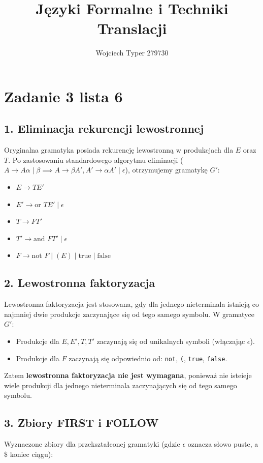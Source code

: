 \documentclass{article}
\title{Języki Formalne i Techniki Translacji}
\author{Wojciech Typer 279730}
\date{}
\begin{document}
\maketitle

\section*{Zadanie 3 lista 6}

\subsection*{1. Eliminacja rekurencji lewostronnej}
Oryginalna gramatyka posiada rekurencję lewostronną w produkcjach dla $E$ oraz $T$. Po zastosowaniu standardowego algorytmu eliminacji ($A \to A\alpha \mid \beta \implies A \to \beta A', A' \to \alpha A' \mid \epsilon$), otrzymujemy gramatykę $G'$:

\begin{itemize}
    \item $E \to T E'$
    \item $E' \to \text{or } T E' \mid \epsilon$
    \item $T \to F T'$
    \item $T' \to \text{and } F T' \mid \epsilon$
    \item $F \to \text{not } F \mid ( E ) \mid \text{true} \mid \text{false}$
\end{itemize}

\subsection*{2. Lewostronna faktoryzacja}
Lewostronna faktoryzacja jest stosowana, gdy dla jednego nieterminala istnieją co najmniej dwie produkcje zaczynające się od tego samego symbolu. W gramatyce $G'$:
\begin{itemize}
    \item Produkcje dla $E, E', T, T'$ zaczynają się od unikalnych symboli (włączając $\epsilon$).
    \item Produkcje dla $F$ zaczynają się odpowiednio od: \texttt{not}, \texttt{(}, \texttt{true}, \texttt{false}. 
\end{itemize}
Zatem \textbf{lewostronna faktoryzacja nie jest wymagana}, ponieważ nie isteieje wiele produkcji dla jednego nieterminala zaczynających się od tego samego symbolu.

\subsection*{3. Zbiory FIRST i FOLLOW}
Wyznaczone zbiory dla przekształconej gramatyki (gdzie $\epsilon$ oznacza słowo puste, a \$ koniec ciągu):
\end{document}
